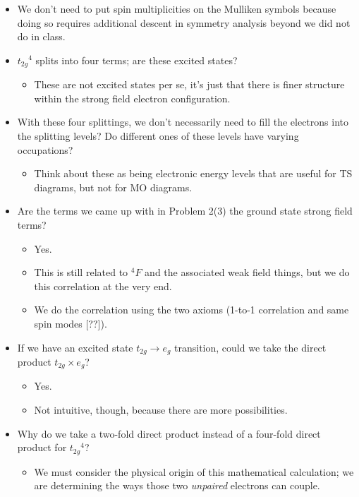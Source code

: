 \documentclass[../notes.tex]{subfiles}
\begin{document}
\begin{itemize}
\begin{itemize}
    \end{itemize}
    \item We don't need to put spin multiplicities on the Mulliken symbols because doing so requires additional descent in symmetry analysis beyond we did not do in class.
    \item ${t_{2g}}^4$ splits into four terms; are these excited states?
    \begin{itemize}
        \item These are not excited states per se, it's just that there is finer structure within the strong field electron configuration.
    \end{itemize}
    \item With these four splittings, we don't necessarily need to fill the electrons into the splitting levels? Do different ones of these levels have varying occupations?
    \begin{itemize}
        \item Think about these as being electronic energy levels that are useful for TS diagrams, but not for MO diagrams.
    \end{itemize}
    \item Are the terms we came up with in Problem 2(3) the ground state strong field terms?
    \begin{itemize}
        \item Yes.
        \item This is still related to ${}^4F$ and the associated weak field things, but we do this correlation at the very end.
        \item We do the correlation using the two axioms (1-to-1 correlation and same spin modes [??]).
    \end{itemize}
    \item If we have an excited state $t_{2g}\to e_g$ transition, could we take the direct product $t_{2g}\times e_g$?
    \begin{itemize}
        \item Yes.
        \item Not intuitive, though, because there are more possibilities.
    \end{itemize}
    \item Why do we take a two-fold direct product instead of a four-fold direct product for ${t_{2g}}^4$?
    \begin{itemize}
        \item We must consider the physical origin of this mathematical calculation; we are determining the ways those two \emph{unpaired} electrons can couple.

\end{itemize}
\end{itemize}
\end{document}
